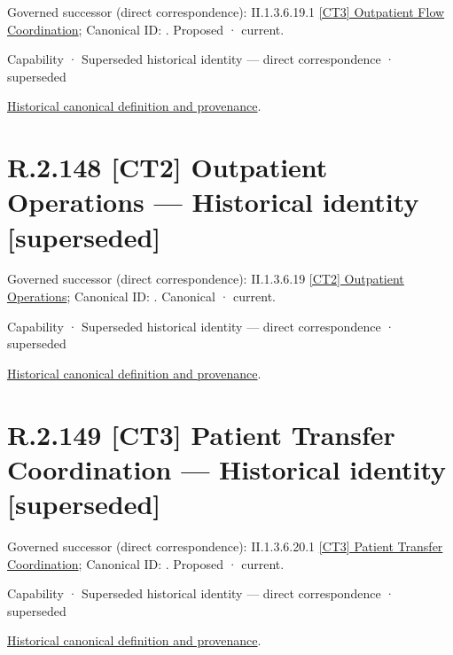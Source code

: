 {\small Governed successor (direct correspondence): II.1.3.6.19.1 \hyperref[element:799ea278af014168b9b534e5fdadc6d1]{[CT3] Outpatient Flow Coordination}; Canonical ID: \texttt{}. Proposed · current.}\par
\label{element:e6c59c7b72fe44169a5fdfd08a5e91c4}
{\small Capability · Superseded historical identity — direct correspondence · superseded}\par
\href{../../../../continuum/strategy/capability/e6c59c7b72fe44169a5fdfd08a5e91c4.md}{Historical canonical definition and provenance}.\par
\section*{R.2.148 [CT2] Outpatient Operations — Historical identity [superseded]}
\label{navigation:R.2.148}

{\small Governed successor (direct correspondence): II.1.3.6.19 \hyperref[element:21399d52b9624ddfbeb786f1d72e40c3]{[CT2] Outpatient Operations}; Canonical ID: \texttt{}. Canonical · current.}\par
\label{element:3db41bc06ade4f9088eec7b8aedd7448}
{\small Capability · Superseded historical identity — direct correspondence · superseded}\par
\href{../../../../continuum/strategy/capability/3db41bc06ade4f9088eec7b8aedd7448.md}{Historical canonical definition and provenance}.\par
\section*{R.2.149 [CT3] Patient Transfer Coordination — Historical identity [superseded]}
\label{navigation:R.2.149}

{\small Governed successor (direct correspondence): II.1.3.6.20.1 \hyperref[element:c7c7aa8e34df4568ae4b91cdde380a11]{[CT3] Patient Transfer Coordination}; Canonical ID: \texttt{}. Proposed · current.}\par
\label{element:b5a76d4877424b2ea9b01fb5fa22772c}
{\small Capability · Superseded historical identity — direct correspondence · superseded}\par
\href{../../../../continuum/strategy/capability/b5a76d4877424b2ea9b01fb5fa22772c.md}{Historical canonical definition and provenance}.\par
